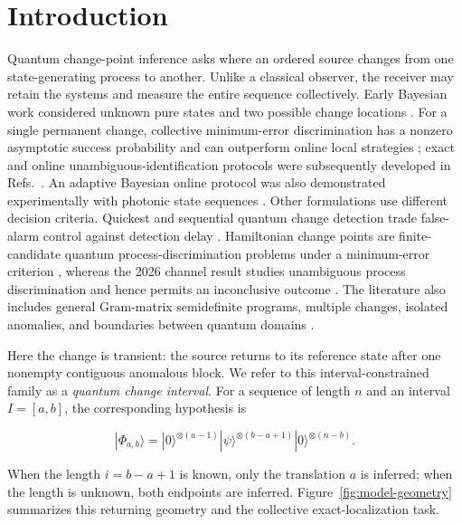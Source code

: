 \section{Introduction}\label{introduction}

Quantum change-point inference asks where an ordered source changes from one
state-generating process to another. Unlike a classical observer, the receiver
may retain the systems and measure the entire sequence collectively.
Early Bayesian work considered unknown pure states and two possible change
locations \cite{akimoto2011}. For a single permanent change, collective
minimum-error discrimination has a nonzero asymptotic success probability and
can outperform online local strategies \cite{sentis2016}; exact and online
unambiguous-identification protocols were subsequently developed in
Refs.~\cite{sentis2017,sentis2018}. An adaptive Bayesian online protocol was
also demonstrated experimentally with photonic state sequences
\cite{yu2018}. Other formulations use different decision criteria. Quickest
and sequential quantum change detection trade false-alarm control against
detection delay \cite{fanizza2023,zecchin2026}. Hamiltonian change
points are finite-candidate quantum process-discrimination problems under a
minimum-error criterion \cite{nakahira2023}, whereas the 2026 channel result
studies unambiguous process discrimination and hence permits an inconclusive
outcome \cite{nakahira2026}. The literature also includes general Gram-matrix
semidefinite programs, multiple changes, isolated anomalies, and boundaries
between quantum domains
\cite{mohan2023,skotiniotis2024,llorens2024,llorens2025}.

Here the change is transient: the source returns to its reference state after
one nonempty contiguous anomalous block. We refer to this
interval-constrained family as a \emph{quantum change interval}. For a
sequence of length \(n\) and an interval \(I=[a,b]\), the corresponding
hypothesis is

\[
|\Phi_{a,b}\rangle
=|0\rangle^{\otimes(a-1)}|\psi\rangle^{\otimes(b-a+1)}
|0\rangle^{\otimes(n-b)}.
\]

When the length \(i=b-a+1\) is known, only the translation \(a\) is inferred;
when the length is unknown, both endpoints are inferred.
Figure~\ref{fig:model-geometry} summarizes this returning geometry and the
collective exact-localization task.

